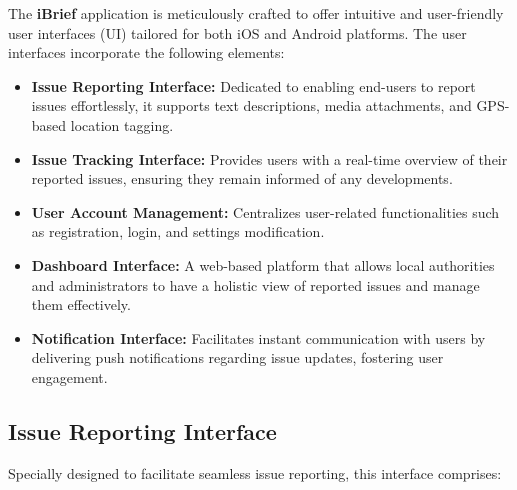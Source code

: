 The \textbf{iBrief} application is meticulously crafted to offer intuitive and user-friendly user interfaces (\gls{UI}) tailored for both iOS and Android platforms. The user interfaces incorporate the following elements:
    
    \begin{itemize}
        \item \textbf{Issue Reporting Interface:} Dedicated to enabling end-users to report issues effortlessly, it supports text descriptions, media attachments, and GPS-based location tagging.
        
        \item \textbf{Issue Tracking Interface:} Provides users with a real-time overview of their reported issues, ensuring they remain informed of any developments.
        
        \item \textbf{User Account Management:} Centralizes user-related functionalities such as registration, login, and settings modification.
        
        \item \textbf{Dashboard Interface:} A web-based platform that allows local authorities and administrators to have a holistic view of reported issues and manage them effectively.
        
        \item \textbf{Notification Interface:} Facilitates instant communication with users by delivering push notifications regarding issue updates, fostering user engagement.
    \end{itemize}

\subsection{Issue Reporting Interface}
    Specially designed to facilitate seamless issue reporting, this interface comprises:
    
